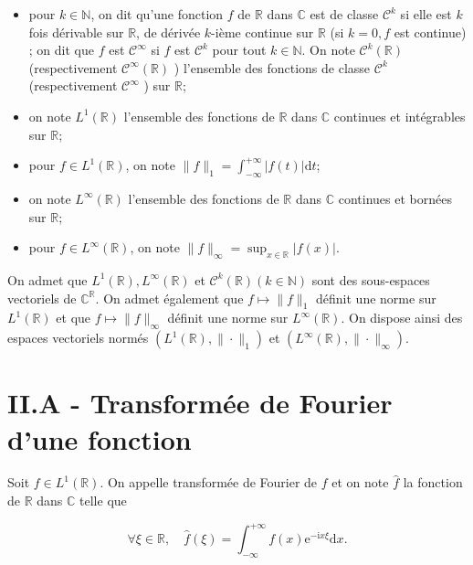 \documentclass[10pt]{article}
\begin{document}
\begin{itemize}
  \item pour $k \in \mathbb{N}$, on dit qu'une fonction $f$ de $\mathbb{R}$ dans $\mathbb{C}$ est de classe $\mathcal{C}^{k}$ si elle est $k$ fois dérivable sur $\mathbb{R}$, de dérivée $k$-ième continue sur $\mathbb{R}$ (si $k=0, f$ est continue) ; on dit que $f$ est $\mathcal{C}^{\infty}$ si $f$ est $\mathcal{C}^{k}$ pour tout $k \in \mathbb{N}$. On note $\mathcal{C}^{k}(\mathbb{R})$ (respectivement $\mathcal{C}^{\infty}(\mathbb{R})$ ) l'ensemble des fonctions de classe $\mathcal{C}^{k}$ (respectivement $\mathcal{C}^{\infty}$ ) sur $\mathbb{R}$;

  \item on note $L^{1}(\mathbb{R})$ l'ensemble des fonctions de $\mathbb{R}$ dans $\mathbb{C}$ continues et intégrables sur $\mathbb{R}$;

  \item pour $f \in L^{1}(\mathbb{R})$, on note $\|f\|_{1}=\int_{-\infty}^{+\infty}|f(t)| \mathrm{d} t$;

  \item on note $L^{\infty}(\mathbb{R})$ l'ensemble des fonctions de $\mathbb{R}$ dans $\mathbb{C}$ continues et bornées sur $\mathbb{R}$;

  \item pour $f \in L^{\infty}(\mathbb{R})$, on note $\|f\|_{\infty}=\sup _{x \in \mathbb{R}}|f(x)|$.

\end{itemize}

On admet que $L^{1}(\mathbb{R}), L^{\infty}(\mathbb{R})$ et $\mathcal{C}^{k}(\mathbb{R})(k \in \mathbb{N})$ sont des sous-espaces vectoriels de $\mathbb{C}^{\mathbb{R}}$. On admet également que $f \mapsto\|f\|_{1}$ définit une norme sur $L^{1}(\mathbb{R})$ et que $f \mapsto\|f\|_{\infty}$ définit une norme sur $L^{\infty}(\mathbb{R})$. On dispose ainsi des espaces vectoriels normés $\left(L^{1}(\mathbb{R}),\|\cdot\|_{1}\right)$ et $\left(L^{\infty}(\mathbb{R}),\|\cdot\|_{\infty}\right)$.

\section{II.A - Transformée de Fourier d'une fonction}
Soit $f \in L^{1}(\mathbb{R})$. On appelle transformée de Fourier de $f$ et on note $\hat{f}$ la fonction de $\mathbb{R}$ dans $\mathbb{C}$ telle que

$$
\forall \xi \in \mathbb{R}, \quad \hat{f}(\xi)=\int_{-\infty}^{+\infty} f(x) \mathrm{e}^{-\mathrm{i} x \xi} \mathrm{d} x .
$$
\end{document}
